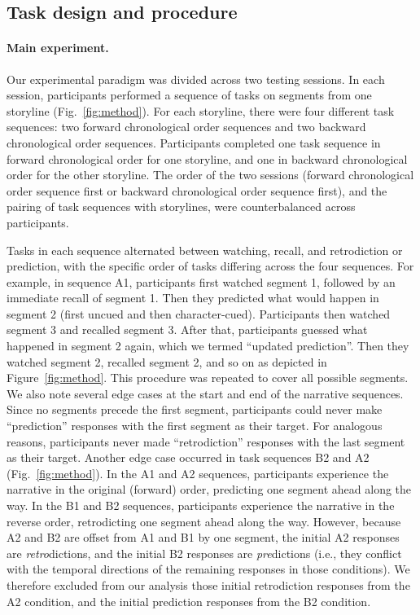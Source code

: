 \documentclass[10pt]{article}
\begin{document}
\subsection*{Task design and procedure}

\paragraph{Main experiment.} Our experimental paradigm was divided across two testing sessions. In each session, participants performed a sequence of tasks on segments from one storyline (Fig.~\ref{fig:method}). For each storyline, there were four different task sequences: two forward chronological order sequences and two backward chronological order sequences. Participants completed one task sequence in forward chronological order for one storyline, and one in backward chronological order for the other storyline. The order of the two sessions (forward chronological order sequence first or backward chronological order sequence first), and the pairing of task sequences with storylines, were counterbalanced across participants.

Tasks in each sequence alternated between watching, recall, and retrodiction or prediction, with the specific order of tasks differing across the four sequences. For example, in sequence A1, participants first watched segment 1, followed by an immediate recall of segment 1. Then they predicted what would happen in segment 2 (first uncued and then character-cued). Participants then watched segment 3 and recalled segment 3. After that, participants guessed what happened in segment 2 again, which we termed ``updated prediction''. Then they watched segment 2, recalled segment 2, and so on as depicted in Figure~\ref{fig:method}. This procedure was repeated to cover all possible segments. We also note several edge cases at the start and end of the narrative sequences. Since no segments precede the first segment, participants could never make ``prediction'' responses with the first segment as their target. For analogous reasons, participants never made ``retrodiction'' responses with the last segment as their target. Another edge case occurred in task sequences B2 and A2 (Fig.~\ref{fig:method}). In the A1 and A2 sequences, participants experience the narrative in the original (forward) order, predicting one segment ahead along the way. In the B1 and B2 sequences, participants experience the narrative in the reverse order, retrodicting one segment ahead along the way. However, because A2 and B2 are offset from A1 and B1 by one segment, the initial A2 responses are \textit{retro}dictions, and the initial B2 responses are \textit{pre}dictions (i.e., they conflict with the temporal directions of the remaining responses in those conditions). We therefore excluded from our analysis those initial retrodiction responses from the A2 condition, and the initial prediction responses from the B2 condition.
\end{document}
